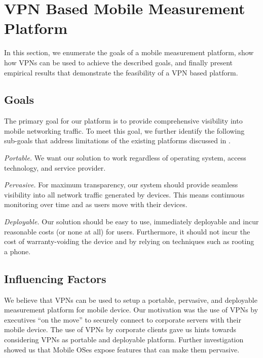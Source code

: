 \section{VPN Based Mobile Measurement Platform} 
\label{sec:platform} 
In this section, we enumerate the goals of a mobile measurement platform,
show how VPNs can be used to achieve the described goals, and finally
present empirical results that demonstrate the feasibility of a VPN based
platform.

\subsection{Goals}  
\label{sec:goals} 
The primary goal for our platform is to provide comprehensive visibility
into mobile networking traffic. To meet this goal, we further identify the
following sub-goals that address limitations of the existing platforms
discussed in .
\begin{packedenumerate}
\item \emph{Portable.} We want our solution to work regardless of
operating system, access technology, and service provider.
\item \emph{Pervasive.} For maximum transparency, our system should
provide seamless visibility into all network traffic generated by devices.
This means continuous monitoring over time and as users move with their
devices.
\item \emph{Deployable.} Our solution should be easy to use, immediately
deployable and incur reasonable costs (or none at all) for users.
Furthermore, it should not incur the cost of warranty-voiding the device
and by relying on techniques such as rooting a phone.
\end{packedenumerate}    

\subsection{Influencing Factors}
\label{sec:factors}

We believe that VPNs can be used to setup a portable, pervasive, and
deployable measurement platform for mobile device. Our motivation was the
use of VPNs by executives ``on the move'' to securely connect to corporate
servers with their mobile device. The use of VPNs by corporate clients gave
us hints towards considering VPNs as portable and deployable platform.
Further investigation showed us that Mobile OSes expose features that can
make them pervasive.  

